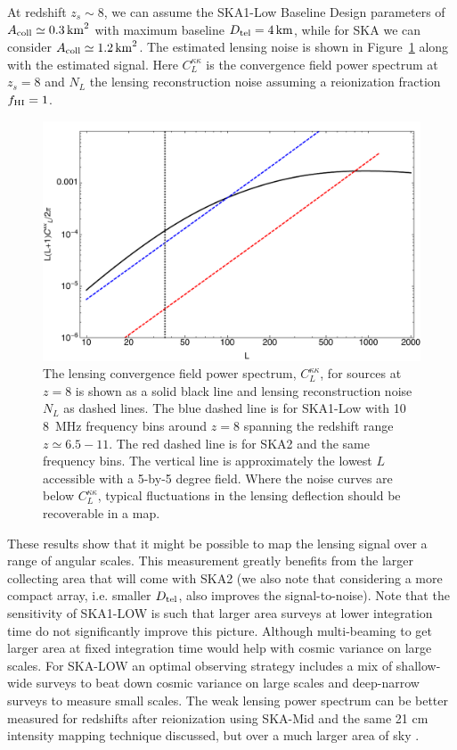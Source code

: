 \documentclass{PoS}
\begin{document}
At redshift $z_s \sim 8$, we can assume the SKA1-Low Baseline Design \citep{Dewdney:2013} parameters of $A_{\rm coll} \simeq 0.3  \, {\rm km}^2$ with maximum baseline $D_{\rm tel}=4 \, {\rm km}$, while for SKA we can consider $A_{\rm coll} \simeq 1.2  \, {\rm km}^2$.
The estimated lensing noise is shown in Figure~\ref{fig:CLNL} along with the estimated signal.  
Here $C^{\kappa \kappa}_L$ is the convergence field power spectrum at $z_s=8$ and $N_L$ the lensing reconstruction noise assuming a reionization fraction $f_{\rm HI}=1$.
\begin{figure}[h]
\centerline{
\includegraphics[scale=0.5]{figures/tomographic_SKA_kappaPS.pdf}
}
\caption{The lensing convergence field power spectrum, $C^{\kappa \kappa}_L$, for sources at $z=8$ is shown as a solid black line and lensing reconstruction noise $N_L$ as dashed lines.  The blue dashed line is for SKA1-Low with 10 8~MHz frequency bins around $z=8$ spanning the redshift range $z \simeq 6.5-11$.  The red dashed line is for SKA2 and the same frequency bins. The vertical line is approximately the lowest $L$ accessible with a 5-by-5 degree field.  Where the noise curves are below $C^{\kappa \kappa}_L$, typical fluctuations in the lensing deflection should be recoverable in a map. }
\label{fig:CLNL}
\end{figure}

These results show that it might be possible to map the lensing signal over a range of angular scales.  This measurement greatly benefits from the larger collecting area that will come with SKA2 (we also note that  considering a more compact array, i.e. smaller $D_{\rm tel}$, also improves the signal-to-noise).  Note that the sensitivity of SKA1-LOW is such that larger area surveys at lower integration time do not significantly improve this picture. Although multi-beaming to get larger area at fixed integration time would help with cosmic variance on large scales. For SKA-LOW an optimal observing strategy includes a mix of shallow-wide surveys to beat down cosmic variance on large scales and deep-narrow surveys to measure small scales. The weak lensing power spectrum can be better measured for redshifts after reionization using SKA-Mid and the same 21 cm intensity mapping technique discussed, but over a much larger area of sky \citep{PourtsidouMetcalf:2014}.
\end{document}

